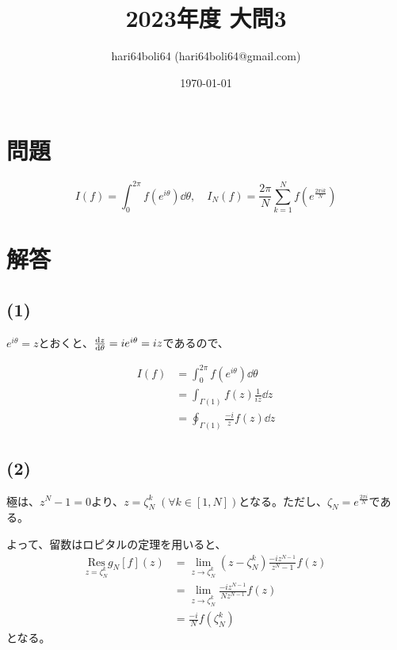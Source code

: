 \documentclass[a4paper, 10pt, dvipdfmx]{jlreq}
\begin{document}
\title{2023年度 大問3}
\author{hari64boli64 (hari64boli64@gmail.com)}
\date{\today}
\maketitle

\section{問題}

\begin{equation*}
  I(f)=\int_0^{2\pi} f(e^{i\theta}) \dd{\theta}, \quad I_N(f)=\frac{2\pi}{N} \sum_{k=1}^N f(e^{\frac{2\pi i k}{N}})
\end{equation*}

\section{解答}

\subsection*{(1)}

$e^{i\theta}=z$とおくと、$\dv{z}{\theta}=ie^{i\theta}=iz$であるので、

\begin{align*}
  I(f) & =\int_0^{2\pi} f(e^{i\theta}) \dd{\theta}  \\
       & =\int_{\Gamma(1)} f(z) \frac{1}{iz} \dd{z} \\
       & =\oint_{\Gamma(1)} \frac{-i}{z}f(z) \dd{z}
\end{align*}

\subsection*{(2)}

極は、$z^N-1=0$より、$z=\zeta_N^k \; (\forall k \in [1,N])$となる。ただし、$\zeta_N=e^{\frac{2\pi i}{N}}$である。

よって、留数はロピタルの定理を用いると、
\begin{align*}
  \underset{z = \zeta_N^k}{\mathrm{Res}} g_N[f](z) & = \lim_{z \to \zeta_N^k} (z-\zeta_N^k)\frac{-iz^{N-1}}{z^N-1}f(z) \\
                                                   & = \lim_{z \to \zeta_N^k} \frac{-iz^{N-1}}{Nz^{N-1}}f(z)           \\
                                                   & = \frac{-i}{N}f(\zeta_N^k)
\end{align*}
となる。
\end{document}
